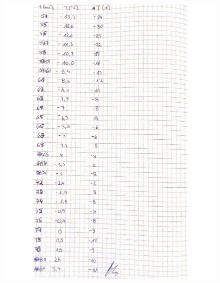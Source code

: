  \begin{figure}[H]
   \centering
   \includegraphics[width=\textwidth]{Bilder/Daten3.pdf}
   \label{fig:Messungen_3}
 \end{figure}
